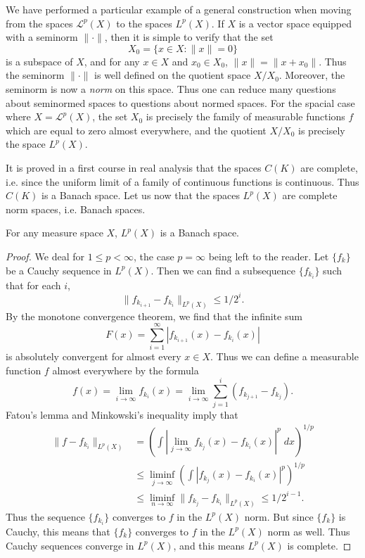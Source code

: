 \begin{remark}
    We have performed a particular example of a general construction when moving from the spaces $\mathcal{L}^p(X)$ to the spaces $L^p(X)$. If $X$ is a vector space equipped with a seminorm $\| \cdot \|$, then it is simple to verify that the set
    \[ X_0 = \{ x \in X: \| x \| = 0 \} \]
    is a subspace of $X$, and for any $x \in X$ and $x_0 \in X_0$, $\| x \| = \| x + x_0 \|$. Thus the seminorm $\| \cdot \|$ is well defined on the quotient space $X/X_0$. Moreover, the seminorm is now a \emph{norm} on this space. Thus one can reduce many questions about seminormed spaces to questions about normed spaces. For the spacial case where $X = \mathcal{L}^p(X)$, the set $X_0$ is precisely the family of measurable functions $f$ which are equal to zero almost everywhere, and the quotient $X/X_0$ is precisely the space $L^p(X)$.
\end{remark}

It is proved in a first course in real analysis that the spaces $C(K)$ are complete, i.e. since the uniform limit of a family of continuous functions is continuous. Thus $C(K)$ is a Banach space. Let us now that the spaces $L^p(X)$ are complete norm spaces, i.e. Banach spaces.

\begin{theorem}
    For any measure space $X$, $L^p(X)$ is a Banach space.
\end{theorem}
\begin{proof}
    We deal for $1 \leq p < \infty$, the case $p = \infty$ being left to the reader. Let $\{ f_k \}$ be a Cauchy sequence in $L^p(X)$. Then we can find a subsequence $\{ f_{k_i} \}$ such that for each $i$,
    \[ \| f_{k_{i + 1}} - f_{k_i} \|_{L^p(X)} \leq 1/2^i. \]
    By the monotone convergence theorem, we find that the infinite sum
    \[ F(x) = \sum_{i = 1}^\infty | f_{k_{i+1}}(x) - f_{k_i}(x)| \]
    is absolutely convergent for almost every $x \in X$. Thus we can define a measurable function $f$ almost everywhere by the formula
    \[ f(x) = \lim_{i \to \infty} f_{k_i}(x) = \lim_{i \to \infty} \sum_{j = 1}^i (f_{k_{j+1}} - f_{k_j}). \]
    Fatou's lemma and Minkowski's inequality imply that
    \begin{align*}
        \| f - f_{k_i} \|_{L^p(X)} &= \left( \int \left| \lim_{j \to \infty} f_{k_j}(x) - f_{k_i}(x) \right|^p\; dx \right)^{1/p}\\
        &\leq \liminf_{j \to \infty} \left( \int \left| f_{k_j}(x) - f_{k_i}(x) \right|^p \right)^{1/p}\\
        &\leq \liminf_{n \to \infty} \| f_{k_j} - f_{k_i} \|_{L^p(X)} \leq 1/2^{i-1}.
    \end{align*}
    Thus the sequence $\{ f_{k_i} \}$ converges to $f$ in the $L^p(X)$ norm. But since $\{ f_k \}$ is Cauchy, this means that $\{ f_k \}$ converges to $f$ in the $L^p(X)$ norm as well. Thus Cauchy sequences converge in $L^p(X)$, and this means $L^p(X)$ is complete.
\end{proof}

